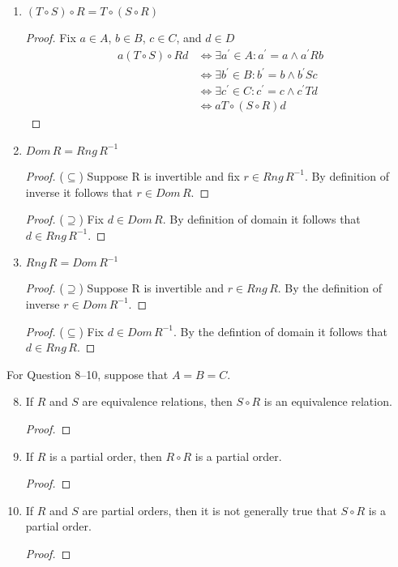 \documentclass{article}
\begin{document}
\begin{enumerate}
    \item $(T \circ S) \circ R = T \circ (S \circ R)$
      \begin{proof}
        Fix $a\in A$, $b\in B$, $c\in C$, and $d\in D$
        \begin{align*}
          a(T\circ S)\circ Rd &\iff \exists a^{'}\in A: a^{'}=a \wedge a^{'}Rb \\
          &\iff \exists b^{'}\in B: b^{'}=b \wedge b^{'}Sc \\
          &\iff \exists c^{'}\in C: c^{'}=c \wedge c^{'}Td \\
          &\iff aT\circ(S\circ R)d
        \end{align*}
      \end{proof}
    \item $Dom\,R = Rng\,R^{-1}$
      \begin{proof} ($\subseteq$)
        Suppose R is invertible and fix $r\in Rng\,R^{-1}$. By definition of inverse it follows that $r\in Dom\,R$.
      \end{proof}
      \begin{proof} ($\supseteq$)
Fix $d\in Dom\,R$. By definition of domain it follows that $d \in Rng\,R^{-1}$.
      \end{proof}
    \item $Rng\,R = Dom\,R^{-1}$
      \begin{proof} ($\supseteq$)
        Suppose R is invertible and $r\in Rng\,R$. By the definition of inverse $r\in Dom\,R^{-1}$.
      \end{proof}
      \begin{proof} ($\subseteq$)
Fix $d\in Dom\,R^{-1}$. By the defintion of domain it follows that $d\in Rng\,R$.
      \end{proof}
  \end{enumerate}
  For Question 8–10, suppose that $A = B = C$.
  \begin{enumerate} \setcounter{enumi}{7}
    \item If $R$ and $S$ are equivalence relations, then $S \circ R$ is an equivalence relation.
      \begin{proof}
        
      \end{proof}
    \item If $R$ is a partial order, then $R \circ R$ is a partial order.
      \begin{proof}
        
      \end{proof}
    \item If $R$ and $S$ are partial orders, then it is not generally true that $S \circ R$ is a partial order.
      \begin{proof}
        
      \end{proof}
  \end{enumerate}
\end{document}
